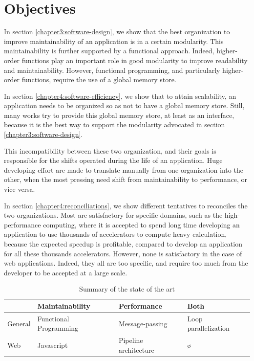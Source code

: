 \section{Objectives}


In section \ref{chapter3:software-design}, we show that the best organization to improve maintainability of an application is in a certain modularity.
This maintainability is further supported by a functional approach.
Indeed, higher-order functions play an important role in good modularity to improve readability and maintainability.
However, functional programming, and particularly higher-order functions, require the use of a global memory store.

In section \ref{chapter4:software-efficiency}, we show that to attain scalability, an application needs to be organized so as not to have a global memory store.
Still, many works try to provide this global memory store, at least as an interface, because it is the best way to support the modularity advocated in section \ref{chapter3:software-design}.

This incompatibility between these two organization, and their goals is responsible for the shifts operated during the life of an application.
Huge developing effort are made to translate manually from one organization into the other, when the most pressing need shift from maintainability to performance, or vice versa.

In section \ref{chapter4:reconciliations}, we show different tentatives to reconciles the two organizations.
Most are satisfactory for specific domains, such as the high-performance computing, where it is accepted to spend long time developing an application to use thousands of accelerators to compute heavy calculation, because the expected speedup is profitable, compared to develop an application for all these thousands accelerators.
However, none is satisfactory in the case of web applications.
Indeed, they all are too specific, and require too much from the developer to be accepted at a large scale.


\begin{table}
\begin{tabular}{l|l|l|l}
             & Maintainability         & Performance           & Both\\\hline
General      & Functional Programming  & Message-passing       & Loop parallelization\\
Web          & Javascript              & Pipeline architecture & ø
\end{tabular}
\caption{Summary of the state of the art}
\label{tab:chapter3:objectives:summary}
\end{table}

